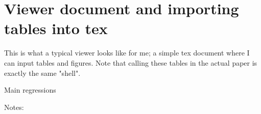 \documentclass[11pt]{article}
\begin{document}
\section*{Viewer document and importing tables into tex}

This is what a typical viewer looks like for me; a simple tex document where I can input tables and figures. Note that calling these tables in the actual paper is exactly the same "shell".

\begin{table}[!htbp]
\centering
\setlength{\tabcolsep}{2pt}
\def\sym#1{\ifmmode^{#1}\else\(^{#1}\)\fi}
\caption{Main regressions}
\footnotesize{

}
\raggedright
\noindent
\footnotesize{Notes: }
\end{table}
\end{document}
